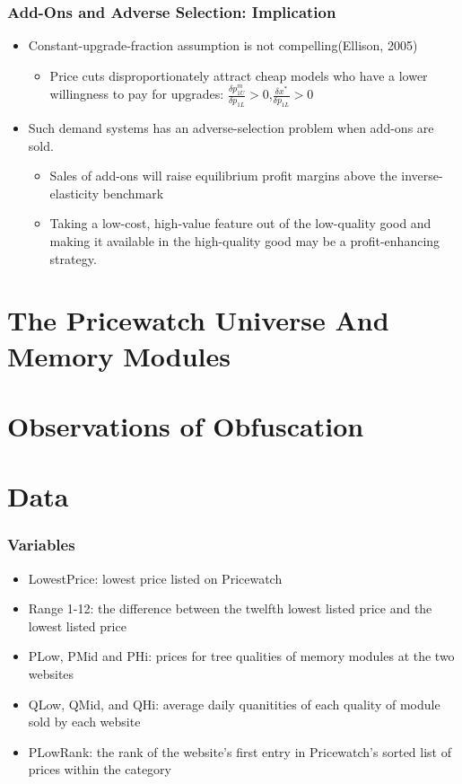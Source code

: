 \documentclass{beamer}
\begin{document}
\begin{frame}
\frametitle{Add-Ons and Adverse Selection: Implication}
\begin{itemize}
\item Constant-upgrade-fraction assumption is not compelling(Ellison, 2005)
  \begin{itemize}
  \item Price cuts disproportionately attract cheap models who have a lower willingness to pay for upgrades:
  $\frac{\delta p^m_{1U}}{\delta p_{1L}}>0$,$\frac{\delta x^*}{\delta p_{1L}}>0$
  \end{itemize}
\item Such demand systems has an adverse-selection problem when add-ons are sold.
    \begin{itemize}
    \item Sales of add-ons will raise equilibrium profit margins above the inverse-elasticity benchmark
    \item Taking a low-cost, high-value feature out of the
low-quality good and making it available in the high-quality good may be a profit-enhancing strategy.
    \end{itemize}
\end{itemize}
\end{frame}

\section{The Pricewatch Universe And Memory Modules}

\section{Observations of Obfuscation}

\section{Data}

\begin{frame}
\frametitle{Variables}
\begin{itemize}
\item LowestPrice: lowest price listed on Pricewatch
\item Range 1-12: the difference between the twelfth lowest listed price and the lowest listed price
\item PLow, PMid and PHi: prices for tree qualities of memory modules at the two websites
\item QLow, QMid, and QHi: average daily quanitities of each quality of module sold by each website
\item PLowRank: the rank of the website's first entry in Pricewatch's sorted list of prices within the category
\end{itemize}
\end{frame}
\end{document}
